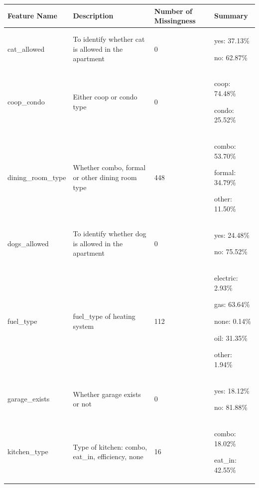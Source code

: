 \documentclass[12pt]{article}
\begin{document}
\begin{table}[H]
    \centering
    \begin{tabular}{|p{3.5cm}|p{5.5cm}|p{2cm}|p{4cm}|}
        \hline
        Feature Name & Description & Number of Missingness & Summary \\
        \hline
        cat\_allowed & To identify whether cat is allowed in the  apartment & 0 & yes: 37.13\% 
        
        no: 62.87\% 
        
        \\
        \hline
        coop\_condo & Either coop or condo type & 0 & coop: 74.48\%
        
        condo: 25.52\%
        
        \\
        
        \hline
        
        dining\_room\_type & Whether combo, formal or other dining room type & 448 & combo: 53.70\%
        
        formal: 34.79\%
        
        other: 11.50\%
        
        \\

        \hline
        
        dogs\_allowed & To identify whether dog is allowed in the apartment & 0 & yes: 24.48\%
        
        no: 75.52\%
        
        \\
        \hline
        
        fuel\_type & fuel\_type of heating system & 112 & electric: 2.93\%
        
        gas: 63.64\%
        
        none: 0.14\%
        
        oil: 31.35\%
        
        other: 1.94\%
        
        \\
        \hline
        garage\_exists & Whether garage exists or not & 0 & yes: 18.12\%
        
        no: 81.88\%
        
        \\
        \hline
        kitchen\_type & Type of kitchen: combo, eat\_in, efficiency, none & 16 & combo: 18.02\%
        
        eat\_in: 42.55\%
        

\end{tabular}
\end{table}
\end{document}
